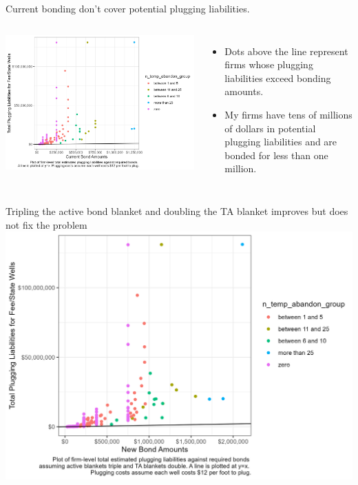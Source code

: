 \documentclass{beamer}
\begin{document}
\begin{frame}{Current bonding don't cover potential plugging liabilities.}
\label{Fig1}
\begin{columns}
             \centering
             \includegraphics[width=1.08\textwidth]{Figures/CurrentBond_v_Costs.jpg}
              \begin{itemize}
                  \item Dots above the line represent firms whose plugging liabilities exceed bonding amounts.\
                  \item My firms have tens of millions of dollars in potential plugging liabilities and are bonded for less than one million.
              \end{itemize}
\end{columns} 
\vspace{1cm}
\end{frame}

\begin{frame}{Tripling the active bond blanket and doubling the TA blanket improves but does not fix the problem}
\vspace{-.3cm}
    \includegraphics[width=0.8\linewidth]{Figures/TripleDoubleBond_v_Costs.jpg}
\end{frame}
\end{document}
